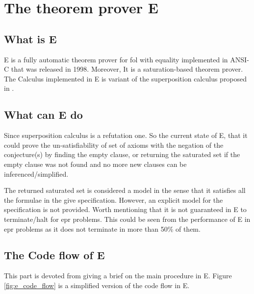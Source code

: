 \section{The theorem prover E} \label{sec:c2s4}
\subsection{What is E}
E is a fully automatic theorem prover for \ac{fol} with equality implemented in ANSI-C that was released in 1998. Moreover, It is a saturation-based theorem prover. The Calculus implemented in E is variant of the superposition calculus proposed in \cite{BAGA94}.


\subsection{What can E do}
Since superposition calculus is a refutation one. So the current state of E, that it could prove the un-satisfiability of set of axioms with the negation of the conjecture(s) by finding the empty clause, or returning the saturated set if the empty clause was not found and no more new clauses can be inferenced/simplified. 


The returned saturated set is considered a model in the sense that it satisfies all the formulae in the give specification. However, an explicit model for the specification is not provided. Worth mentioning that it is not guaranteed in E to terminate/halt for \ac{epr} problems. This could be seen from the performance of E in \ac{epr} problems as it does not terminate in more than 50\% of them. 



\subsection{The Code flow of E}
This part is devoted from giving a brief on the main procedure in E. Figure \ref{fig:e_code_flow} is a simplified version of the code flow in E.

